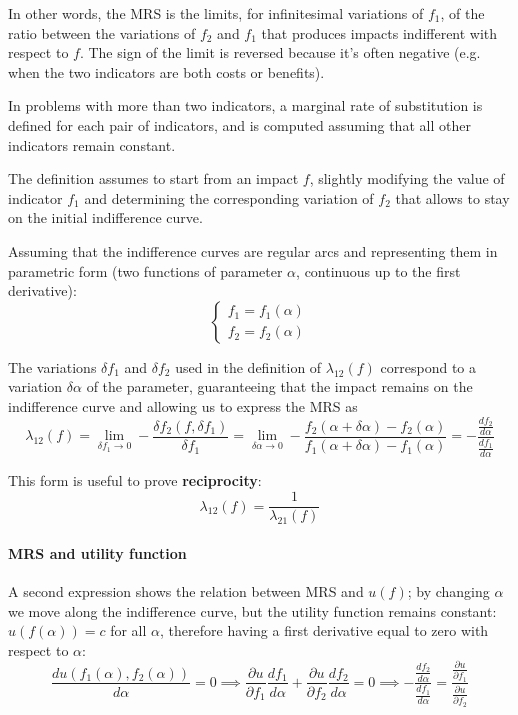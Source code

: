In other words, the MRS is the limits, for infinitesimal variations of $f_1$, of the ratio between the variations of $f_2$ and $f_1$ that produces impacts indifferent with respect to $f$. The sign of the limit is reversed because it's often negative (e.g. when the two indicators are both costs or benefits).

In problems with more than two indicators, a marginal rate of substitution is defined for each pair of indicators, and is computed assuming that all other indicators remain constant.

The definition assumes to start from an impact $f$, slightly modifying the value of indicator $f_1$ and determining the corresponding variation of $f_2$ that allows to stay on the initial indifference curve.

Assuming that the indifference curves are regular arcs and representing them in parametric form (two functions of parameter $\alpha$, continuous up to the first derivative): 
$$
\begin{cases}
	f_1 = f_1 (\alpha) \\ f_2 = f_2 (\alpha)
\end{cases}
$$

The variations $\delta f_1$ and $\delta f_2$ used in the definition of $\lambda_{12}(f)$ correspond to a variation $\delta \alpha$ of the parameter, guaranteeing that the impact remains on the indifference curve and allowing us to express the MRS as
$$ \lambda_{12} (f) = \lim_{\delta f_1 \rightarrow 0} - \frac{\delta f_2 (f, \delta f_1)}{\delta f_1} = \lim_{\delta \alpha \rightarrow 0} - \frac{f_2 (\alpha + \delta \alpha) - f_2 (\alpha)}{f_1 (\alpha + \delta \alpha) - f_1 (\alpha)} = - \frac{\frac{df_2}{d\alpha}}{\frac{d f_1}{d \alpha}} $$

This form is useful to prove \textbf{reciprocity}:
$$ \lambda_{12} (f) = \frac{1}{\lambda_{21} (f)} $$

\paragraph{MRS and utility function} A second expression shows the relation between MRS and $u(f)$; by changing $\alpha$ we move along the indifference curve, but the utility function remains constant: $u(f(\alpha)) = c$ for all $\alpha$, therefore having a first derivative equal to zero with respect to $\alpha$:
$$ \frac{d u(f_1 (\alpha), f_2 (\alpha))}{d \alpha} = 0 \implies \frac{\partial u}{\partial f_1} \frac{d f_1}{d \alpha} + \frac{\partial u}{\partial f_2} \frac{d f_2}{d \alpha} = 0 \implies - \frac{\frac{df_2}{d\alpha}}{\frac{df_1}{d \alpha}} = \frac{\frac{\partial u}{\partial f_1}}{\frac{\partial u}{\partial f_2}} $$


